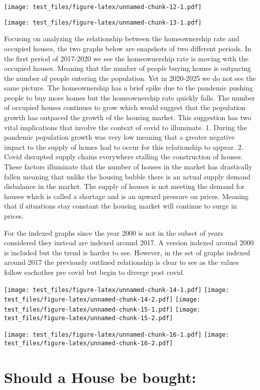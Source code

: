 \documentclass[
]{article}
\begin{document}
\texttt{[image: test\_files/figure-latex/unnamed-chunk-12-1.pdf]}

\texttt{[image: test\_files/figure-latex/unnamed-chunk-13-1.pdf]}

Focusing on analyzing the relationship between the homeownership rate
and occupied houses, the two graphs below are snapshots of two different
periods. In the first period of 2017-2020 we see the homeownership rate
is moving with the occupied houses. Meaning that the number of people
buying homes is outpacing the number of people entering the population.
Yet in 2020-2025 we do not see the same picture. The homeownership has a
brief spike due to the pandemic pushing people to buy more homes but the
homeownership rate quickly falls. The number of occupied houses
continues to grow which would suggest that the population growth has
outpaced the growth of the housing market. This suggestion has two vital
implications that involve the context of covid to illuminate. 1. During
the pandemic population growth was very low meaning that a greater
negative impact to the supply of homes had to occur for this
relationship to appear. 2. Covid disrupted supply chains everywhere
stalling the construction of houses. These factors illuminate that the
number of houses in the market has drastically fallen meaning that
unlike the housing bubble there is an actual supply demand disbalance in
the market. The supply of houses is not meeting the demand for houses
which is called a shortage and is an upward pressure on prices. Meaning
that if situations stay constant the housing market will continue to
surge in prices.

For the indexed graphs since the year 2000 is not in the subset of years
considered they instead are indexed around 2017. A version indexed
around 2000 is included but the trend is harder to see. However, in the
set of graphs indexed around 2017 the previously outlined relationship
is clear to see as the values follow eachother pre covid but begin to
diverge post covid.

\texttt{[image: test\_files/figure-latex/unnamed-chunk-14-1.pdf]}
\texttt{[image: test\_files/figure-latex/unnamed-chunk-14-2.pdf]}
\texttt{[image: test\_files/figure-latex/unnamed-chunk-15-1.pdf]}
\texttt{[image: test\_files/figure-latex/unnamed-chunk-15-2.pdf]}

\texttt{[image: test\_files/figure-latex/unnamed-chunk-16-1.pdf]}
\texttt{[image: test\_files/figure-latex/unnamed-chunk-16-2.pdf]}

\section{Should a House be bought:}\label{should-a-house-be-bought}
\end{document}
